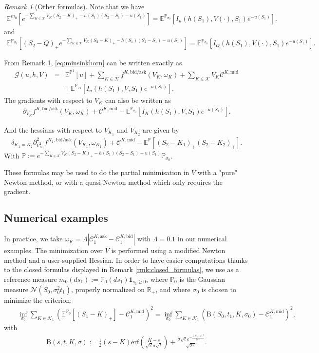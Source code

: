\documentclass{amsart}%
\def\b*{\begin{eqnarray*}}
\def\e*{\end{eqnarray*}}
\def \E{\mathbb{E}}
\def \P{{\mathbb P}}
\def\Cc{{\cal C}}
\def\Gc{{\cal G}}
\def\Nc{{\cal N}}
\def\no{\noindent}
\theoremstyle{definition}
\theoremstyle{remark}
\newtheorem{rem}[thm]{Remark}
\newcommand{\PP}{\mathbb{P}}
\newcommand{\beaa}{\begin{eqnarray*}}
\newcommand{\eeaa}{\end{eqnarray*}}
\newcommand{\EE}{{\mathbb E}}
\newcommand{\RR}{{\mathbb R}}
\newcommand{\cal}{\mathcal}
\begin{document}
\begin{rem}[Other formulas] \label{remint}
Note that we have
\beaa
\EE^{{m_0}}\left[  e^{- \sum_{K \in {\cal K}} V_K (S_{2}-K)_+ -h(S_1)(S_2-S_1)-u(S_1)  }\right]
=\EE^{\PP_{\sigma_0}}\left[ I_u(h(S_1),V(\cdot),S_1) e ^{-u(S_1)  } \right].
\eeaa and
\beaa
\EE^{\PP_{\sigma_0}}\left[   (S_{2}-Q)_+ e^{- \sum_{K \in {\cal K}} V_K (S_{2}-K)_+ -h(S_1)(S_2-S_1)-u(S_1)  }\right]
=\EE^{\PP_{\sigma_0}}\left[ I_Q(h(S_1),V(\cdot),S_1) e ^{-u(S_1)  } \right].
\eeaa

From Remark \ref{remint}, \eqref{eq:minsinkhorn} can be written exactly as
\b*
\Gc(u,h,V)&=&  \E^{\P^1}[u]+ \sum_{K \in {\cal K}}f^{K,\mathrm{bid}/\mathrm{ask}}(V_K,\omega_K)+\sum_{K \in {\cal K}}  V_K \Cc^{K,\mathrm{mid}}\\
&&+\EE^{\PP_{\sigma_0}}\left[  I_u(h(S_1),V,S_1) e ^{-u(S_1)  }\right]. \nonumber
\e*
The gradients with respect to $V_K$ can also be written  as
\b*
\partial_{V_K} f^{K,\mathrm{bid}/\mathrm{ask}}(V_K,\omega_K)+\Cc^{K,\mathrm{mid}}
-\EE^{\PP_{\sigma_0}}\left[ I_K(h(S_1),V,S_1) e ^{-u(S_1)  } \right].
\e*

And the hessians with respect to $V_{K_1}$ and $V_{K_2}$ are given by
\b*
\delta_{K_1=K_2}\partial^2_{V_{K_1}^2} f^{K_1,\mathrm{bid}/\mathrm{ask}}(V_{K_1},\omega_{K_1})+\Cc^{K,\mathrm{mid}}
-\EE^{\P}\left[ (S_2-K_1)_+(S_2-K_2)_+ \right].
\e*
\no With $\P := e^{- \sum_{K \in {\cal K}} V_K (S_{2}-K)_+ -h(S_1)(S_2-S_1)-u(S_1)  }\PP_{\sigma_0}$.

\no These formulas may be used to do the partial minimisation in $V$ with a "pure" Newton method, or with a quasi-Newton method which only requires the gradient.

 \end{rem}
 
  \subsection{Numerical examples}
\no In practice, we take $\omega_K=\Lambda|\Cc^{K,\mathrm{ask}}_1-\Cc^{K,\mathrm{bid}}_1|$ with
$\Lambda=0.1$ in our numerical examples. The minimization over $V$ is performed using a
modified Newton method and a user-supplied Hessian. In order to have easier computations thanks to the closed formulas displayed in Remark \ref{rmk:closed_formulas}, we use as a reference measure $m_0(ds_1):=\P_0(ds_1)\mathbf{1}_{s_1\ge 0}$, where $\P_0$ is the Gaussian measure $\Nc(S_0,\sigma_0^2t_1)$, properly normalized on $\RR_+$, and where $\sigma_0$ is chosen to minimize the criterion:
\beaa
&&\inf_{\sigma_0} \sum_{K \in {\cal K}_1} \left(\EE^{\PP_0}[ (S_1-K)_+]-\Cc^{K,\mathrm{mid}}_1 \right)^2 =\inf_{\sigma_0} \sum_{K \in {\cal K}_1} \left( \mathrm{B}(S_0,t_1,K,\sigma_0 )-\Cc^{K,\mathrm{mid}}_1 \right)^2,
\eeaa
with
\beaa \mathrm{B}(s,t,K,\sigma):=\frac{1}{2} (s-K) \text{erf}\left(\frac{K-s}{\sqrt{2} \sigma  \sqrt{t}}\right)+\frac{\sigma
   \sqrt{t} e^{-\frac{(K-s)^2}{2 \sigma ^2 t}}}{\sqrt{2 \pi }}.
   \eeaa
\end{document}
